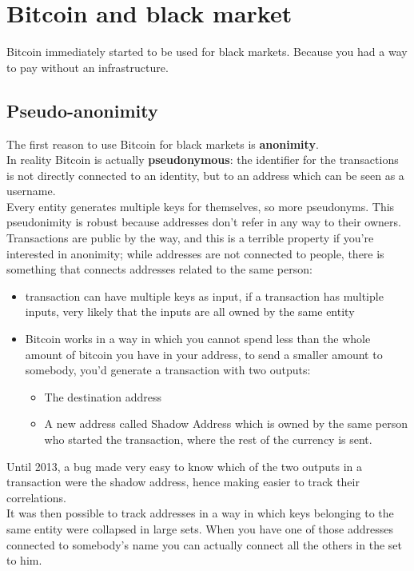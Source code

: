 \section{Bitcoin and black market}
    Bitcoin immediately started to be used for black markets. Because you had a way to pay without an infrastructure.
    \subsection{Pseudo-anonimity}
        The first reason to use Bitcoin for black markets is \textbf{anonimity}.\\ 
        In reality Bitcoin is actually \textbf{pseudonymous}: the identifier for the transactions is not directly connected to an identity, but to an address which can be seen as a username.\\
        Every entity generates multiple keys for themselves, so more pseudonyms. This pseudonimity is robust because addresses don't refer in any way to their owners.\\
        Transactions are public by the way, and this is a terrible property if you're interested in anonimity; while addresses are not connected to people, there is something that connects addresses related to the same person:
        \begin{itemize}
            \item transaction can have multiple keys as input, if a transaction has multiple inputs, very likely that the inputs are all owned by the same entity
            \item Bitcoin works in a way in which you cannot spend less than the whole amount of bitcoin you have in your address, to send a smaller amount to somebody, you'd generate a transaction with two outputs:
            \begin{itemize}
                \item The destination address
                \item A new address called Shadow Address which is owned by the same person who started the transaction, where the rest of the currency is sent.
            \end{itemize}
        \end{itemize}
        Until 2013, a bug made very easy to know which of the two outputs in a transaction were the shadow address, hence making easier to track their correlations.\\
        It was then possible to track addresses in a way in which keys belonging to the same entity were collapsed in large sets. When you have one of those addresses connected to somebody's name you can actually connect all the others in the set to him.
